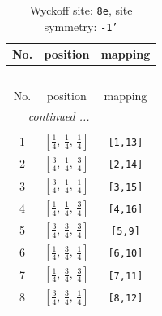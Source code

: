 \documentclass[fleqn,8pt]{jsarticle}
\begin{document}
\renewcommand{\arraystretch}{1.2}
\begin{longtable}{ccc}
\caption{Wyckoff site: {\tt 8e}, site symmetry: {\tt -1'}}
 \\
 \hline \hline
No. & position & mapping \\ \hline \endfirsthead

\multicolumn{2}{l}{\tablename\ \thetable{}} \\
 \hline \hline
No. & position & mapping \\ \hline \endhead

 \hline \hline
\multicolumn{2}{r}{\footnotesize\it continued ...} \\ \endfoot

 \hline \hline
\multicolumn{2}{r}{} \\ \endlastfoot

1 & $\left[ \frac{1}{4},\, \frac{1}{4},\, \frac{1}{4} \right]$ & {\tt [1,13]} \\ \hline
2 & $\left[ \frac{3}{4},\, \frac{1}{4},\, \frac{3}{4} \right]$ & {\tt [2,14]} \\ \hline
3 & $\left[ \frac{3}{4},\, \frac{1}{4},\, \frac{1}{4} \right]$ & {\tt [3,15]} \\ \hline
4 & $\left[ \frac{1}{4},\, \frac{1}{4},\, \frac{3}{4} \right]$ & {\tt [4,16]} \\ \hline
5 & $\left[ \frac{3}{4},\, \frac{3}{4},\, \frac{3}{4} \right]$ & {\tt [5,9]} \\ \hline
6 & $\left[ \frac{1}{4},\, \frac{3}{4},\, \frac{1}{4} \right]$ & {\tt [6,10]} \\ \hline
7 & $\left[ \frac{1}{4},\, \frac{3}{4},\, \frac{3}{4} \right]$ & {\tt [7,11]} \\ \hline
8 & $\left[ \frac{3}{4},\, \frac{3}{4},\, \frac{1}{4} \right]$ & {\tt [8,12]} \\
\end{longtable}
\renewcommand{\arraystretch}{1.2}
\end{document}
